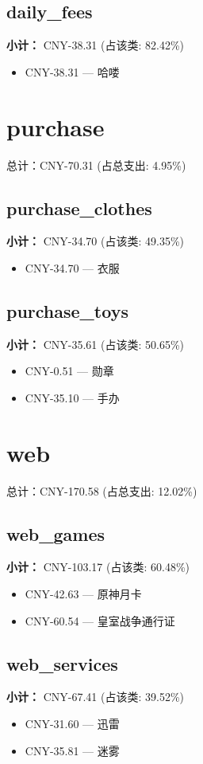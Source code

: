 \documentclass[12pt]{article}
\begin{document}
\subsection*{daily\_fees}
\textbf{小计：} CNY-38.31 (占该类: 82.42\%)
\begin{itemize}
    \item CNY-38.31 --- 哈喽
\end{itemize}
\section*{purchase}
总计：CNY-70.31 	 (占总支出: 4.95\%)

\subsection*{purchase\_clothes}
\textbf{小计：} CNY-34.70 (占该类: 49.35\%)
\begin{itemize}
    \item CNY-34.70 --- 衣服
\end{itemize}
\subsection*{purchase\_toys}
\textbf{小计：} CNY-35.61 (占该类: 50.65\%)
\begin{itemize}
    \item CNY-0.51 --- 勋章
    \item CNY-35.10 --- 手办
\end{itemize}
\section*{web}
总计：CNY-170.58 	 (占总支出: 12.02\%)

\subsection*{web\_games}
\textbf{小计：} CNY-103.17 (占该类: 60.48\%)
\begin{itemize}
    \item CNY-42.63 --- 原神月卡
    \item CNY-60.54 --- 皇室战争通行证
\end{itemize}
\subsection*{web\_services}
\textbf{小计：} CNY-67.41 (占该类: 39.52\%)
\begin{itemize}
    \item CNY-31.60 --- 迅雷
    \item CNY-35.81 --- 迷雾
\end{itemize}
\end{document}
